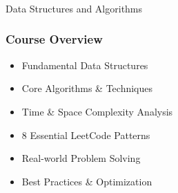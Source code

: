 \begin{frame}[fragile]\frametitle{}
\begin{center}
{\Large Data Structures and Algorithms}
\end{center}
\end{frame}


\begin{frame}[fragile]\frametitle{Course Overview}

      \begin{itemize}
        \item Fundamental Data Structures
        \item Core Algorithms \& Techniques
        \item Time \& Space Complexity Analysis
        \item 8 Essential LeetCode Patterns
        \item Real-world Problem Solving
        \item Best Practices \& Optimization
      \end{itemize}

\end{frame}

